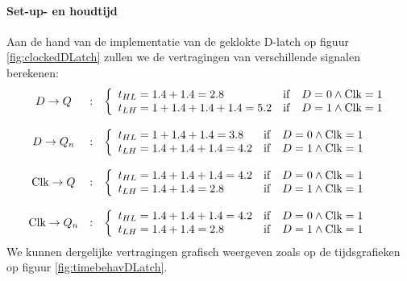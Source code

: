 \paragraph{Set-up- en houdtijd}
Aan de hand van de implementatie van de geklokte D-latch op figuur \ref{fig:clockedDLatch} zullen we de vertragingen van verschillende signalen berekenen:
\begin{equation}
\begin{array}{ccl}
D\rightarrow Q&:&\left\{\begin{array}{lll}
t_{HL}=1.4+1.4=2.8&\operatorname{if}&D=0\wedge\mbox{Clk}=1\\
t_{LH}=1+1.4+1.4+1.4=5.2&\operatorname{if}&D=1\wedge\mbox{Clk}=1
\end{array}\right.\\\\
D\rightarrow Q_n&:&\left\{\begin{array}{lll}
t_{HL}=1+1.4+1.4=3.8&\operatorname{if}&D=0\wedge\mbox{Clk}=1\\
t_{LH}=1.4+1.4+1.4=4.2&\operatorname{if}&D=1\wedge\mbox{Clk}=1
\end{array}\right.\\\\
\mbox{Clk}\rightarrow Q&:&\left\{\begin{array}{lll}
t_{HL}=1.4+1.4+1.4=4.2&\operatorname{if}&D=0\wedge\mbox{Clk}=1\\
t_{LH}=1.4+1.4=2.8&\operatorname{if}&D=1\wedge\mbox{Clk}=1
\end{array}\right.\\\\
\mbox{Clk}\rightarrow Q_n&:&\left\{\begin{array}{lll}
t_{HL}=1.4+1.4+1.4=4.2&\operatorname{if}&D=0\wedge\mbox{Clk}=1\\
t_{LH}=1.4+1.4=2.8&\operatorname{if}&D=1\wedge\mbox{Clk}=1
\end{array}\right.
\end{array}
\label{eqn:dLatchDelays}
\end{equation}
We kunnen dergelijke vertragingen grafisch weergeven zoals op de tijdsgrafieken op figuur \ref{fig:timebehavDLatch}.
